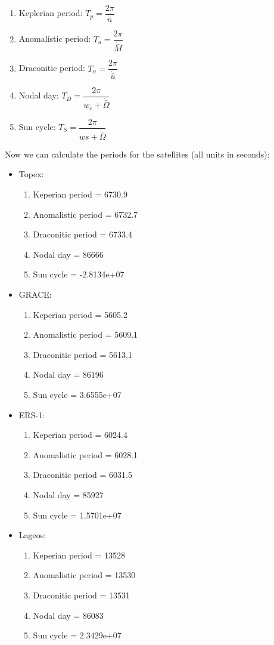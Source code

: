 \documentclass[conf]{new-aiaa}
\begin{document}
\begin{enumerate}[label=(\alph*)]
	\item Keplerian period: $T_p = \dfrac{2 \pi}{\bar{n}}$
	\item Anomalistic period: $T_a = \dfrac{2 \pi}{\dot{\bar{M}}}$
	\item Draconitic period: $T_n = \dfrac{2 \pi}{ \dot{ \bar{u} } } $
	\item Nodal day: $T_D = \dfrac{2 \pi}{w_e + \dot{ \bar{\Omega} }} $
	\item Sun cycle: $T_S = \dfrac{2 \pi}{ws + \dot{ \bar{\Omega} }} $ \newline 
\end{enumerate}

Now we can calculate the periods for the satellites (all units in seconds): \newline 

\begin{itemize}
	\item Topex: 
	\begin{enumerate}[label=(\alph*)]
		\item Keperian period = 6730.9
		\item Anomalistic period = 6732.7 
		\item Draconitic period = 6733.4 
		\item Nodal day = 86666 
		\item Sun cycle = -2.8134e+07 
	\end{enumerate} 
	\item GRACE: 
	\begin{enumerate}[label=(\alph*)]
		\item Keperian period = 5605.2 
		\item Anomalistic period = 5609.1 
		\item Draconitic period = 5613.1 
		\item Nodal day = 86196 
		\item Sun cycle = 3.6555e+07
	\end{enumerate}
	\item ERS-1: 
	\begin{enumerate}[label=(\alph*)]
		\item Keperian period = 6024.4
		\item Anomalistic period = 6028.1
		\item Draconitic period = 6031.5
		\item Nodal day = 85927
		\item Sun cycle = 1.5701e+07
	\end{enumerate}
	\item Lageos: 
	\begin{enumerate}[label=(\alph*)]
		\item Keperian period = 13528
		\item Anomalistic period = 13530 
		\item Draconitic period = 13531
		\item Nodal day = 86083
		\item Sun cycle = 2.3429e+07
	\end{enumerate}
\end{itemize}
\end{document}
